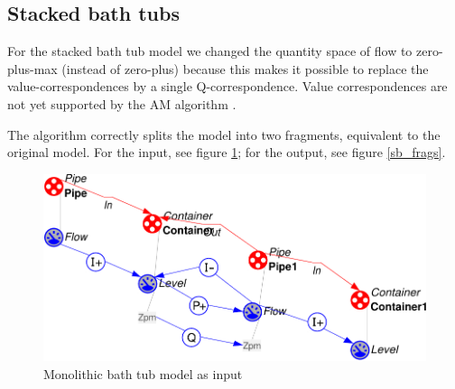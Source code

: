 \documentclass{article} %
\begin{document}
\subsection{Stacked bath tubs}

For the stacked bath tub model we changed the quantity space of flow to 
zero-plus-max (instead of zero-plus) because this makes it possible to replace
the value-correspondences by a single Q-correspondence. Value correspondences
are not yet supported by the AM algorithm \cite{vanweelden}.  

The algorithm correctly splits the model into two fragments, equivalent to the
original model. For the input, see figure \ref{sb_mono}; for the output, see
figure \ref{sb_frags}.

\begin{figure}[ht]
\centering
\includegraphics[scale=0.5]{sb_mono-crop.pdf}
\caption{Monolithic bath tub model as input}
\label{sb_mono}
\end{figure}
\end{document}
